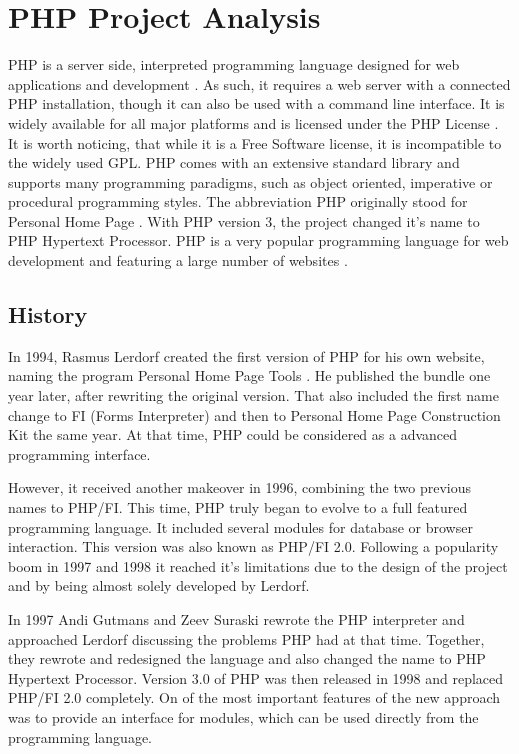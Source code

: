 \section{PHP Project Analysis} %


PHP is a server side, interpreted programming language designed for web
applications and development \cite{PHPIntro}. As such, it requires a web server
with a connected PHP installation, though it can also be used with a command
line interface. It is widely available for all major platforms and is licensed
under the PHP License \cite{PHPManual}. It is worth noticing, that while it is
a Free Software license, it is incompatible to the widely used \ac{GPL}. PHP
comes with an extensive standard library and supports many programming
paradigms, such as object oriented, imperative or procedural programming
styles. The abbreviation PHP originally stood for Personal Home Page
\cite{PHPHistory}. With PHP version 3, the project changed it's name to PHP
Hypertext Processor. PHP is a very popular programming language for web
development and featuring a large number of websites
\cite{PHPW3Techs,PHPStats}.

\subsection{History} %

In 1994, Rasmus Lerdorf created the first version of PHP for his own website,
naming the program Personal Home Page Tools \cite{PHPHistory}. He published the
bundle one year later, after rewriting the original version. That also included
the first name change to FI (Forms Interpreter) and then to Personal Home Page
Construction Kit the same year. At that time, PHP could be considered as a
advanced programming interface.

However, it received another makeover in 1996, combining the two previous names
to PHP/FI. This time, PHP truly began to evolve to a full featured programming
language. It included several modules for database or browser interaction. This
version was also known as PHP/FI 2.0. Following a popularity boom in 1997 and
1998 it reached it's limitations due to the design of the project and by being
almost solely developed by Lerdorf.

In 1997 Andi Gutmans and Zeev Suraski rewrote the PHP interpreter and
approached Lerdorf discussing the problems PHP had at that time. Together, they
rewrote and redesigned the language and also changed the name to PHP Hypertext
Processor. Version 3.0 of PHP was then released in 1998 and replaced PHP/FI 2.0
completely. On of the most important features of the new approach was to
provide an interface for modules, which can be used directly from the
programming language.

